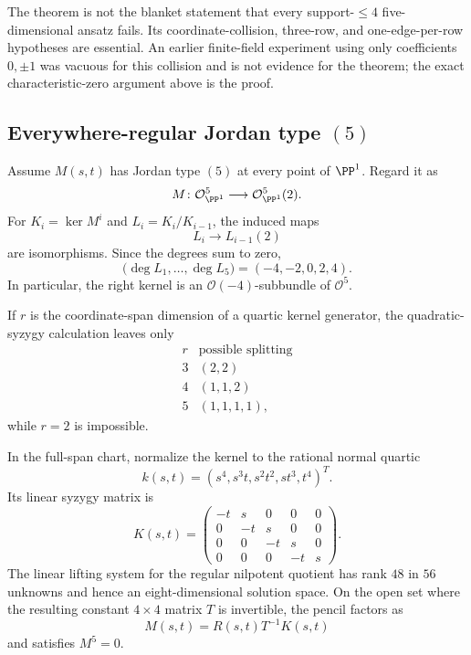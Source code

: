 \begin{remark}
\label{rem:n5-scope-correction}
The theorem is not the blanket statement that every support-\(\le4\)
five-dimensional ansatz fails.  Its coordinate-collision, three-row, and
one-edge-per-row hypotheses are essential.  An earlier finite-field
experiment using only coefficients \(0,\pm1\) was vacuous for this collision
and is not evidence for the theorem; the exact characteristic-zero argument
above is the proof.
\end{remark}

\subsection{Everywhere-regular Jordan type
  \texorpdfstring{\((5)\)}{(5)}}

Assume \(M(s,t)\) has Jordan type \((5)\) at every point of \(\PP^1\).
Regard it as
\[
M\colon\mathcal O_{\PP^1}^5\longrightarrow
\mathcal O_{\PP^1}^5(2).
\]
For \(K_i=\ker M^i\) and \(L_i=K_i/K_{i-1}\), the induced maps
\[
L_i\longrightarrow L_{i-1}(2)
\]
are isomorphisms.  Since the degrees sum to zero,
\begin{equation}
\label{eq:n5-filtration-degrees}
\bigl(\deg L_1,\ldots,\deg L_5\bigr)=(-4,-2,0,2,4).
\end{equation}
In particular, the right kernel is an
\(\mathcal O(-4)\)-subbundle of \(\mathcal O^5\).

If \(r\) is the coordinate-span dimension of a quartic kernel generator,
the quadratic-syzygy calculation leaves only
\[
\begin{array}{c|c}
r&\text{possible splitting}\\ \hline
3&(2,2)\\
4&(1,1,2)\\
5&(1,1,1,1),
\end{array}
\]
while \(r=2\) is impossible.

In the full-span chart, normalize the kernel to the rational normal quartic
\[
k(s,t)=(s^4,s^3t,s^2t^2,st^3,t^4)^T.
\]
Its linear syzygy matrix is
\[
K(s,t)=
\begin{pmatrix}
-t&s&0&0&0\\
0&-t&s&0&0\\
0&0&-t&s&0\\
0&0&0&-t&s
\end{pmatrix}.
\]
The linear lifting system for the regular nilpotent quotient has rank
\(48\) in \(56\) unknowns and hence an eight-dimensional solution space.
On the open set where the resulting constant \(4\times4\) matrix \(T\) is
invertible, the pencil factors as
\[
M(s,t)=R(s,t)T^{-1}K(s,t)
\]
and satisfies \(M^5=0\).

